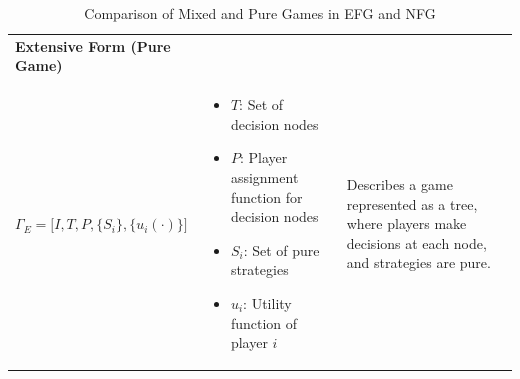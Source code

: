 \documentclass{article}
\begin{document}
\begin{table}[h!]
\begin{tabular}{@{}m{} m{} m{}@{}}
\midrule
\textbf{Extensive Form (Pure Game)}\\ %
$\Gamma_E = \big[I, T, P, \{S_i\}, \{u_i(\cdot)\}\big]$ & \begin{itemize}
  \item $T$: Set of decision nodes
  \item $P$: Player assignment function for decision nodes
  \item $S_i$: Set of pure strategies
  \item $u_i$: Utility function of player $i$
\end{itemize} & Describes a game represented as a tree, where players make decisions at each node, and strategies are pure. \\
\bottomrule
\end{tabular}
\caption{Comparison of Mixed and Pure Games in EFG and NFG}
\label{tab:games_table}
\end{table}
\end{document}
